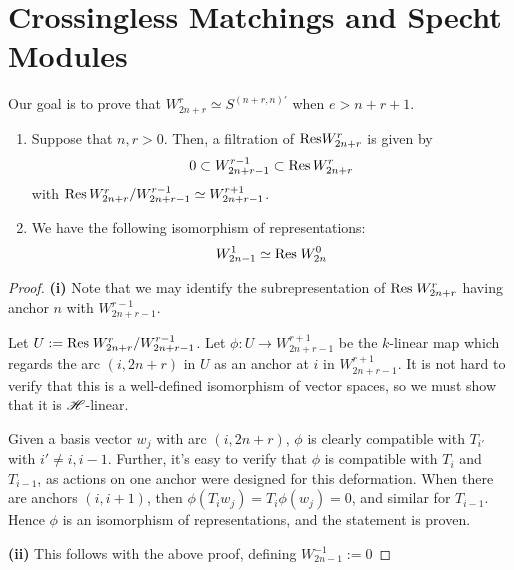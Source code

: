 \documentclass{amsart}
\begin{document}
\newpage
\section{Crossingless Matchings and Specht Modules}
Our goal is to prove that $W_{2n + r}^r \simeq S^{(n+r,n)'}$ when $e > n + r + 1$.
\begin{proposition}
  \begin{enumerate}[label={(\roman*)}]
    \item
    Suppose that $n,r > 0$.
    Then, a filtration of $\text{Res} W_{2n + r}^r$ is given by
    \begin{equation}
      0 \subset W_{2n + r - 1}^{r-1} \subset \text{Res} \, W_{2n + r}^r \label{Filtration}
    \end{equation}
    with $\text{Res} \, W_{2n + r}^r / W_{2n + r - 1}^{r-1} \simeq W_{2n + r - 1}^{r + 1}$. 
    \item
      We have the following isomorphism of representations:
      \begin{equation}
        W_{2n - 1}^1 \simeq \text{Res} \; W_{2n}^0 \label{0 Restriction}
      \end{equation}
  \end{enumerate}
\end{proposition}
\begin{proof}
  \textbf{(i)}
  Note that we may identify the subrepresentation of $\text{Res} \; W_{2n + r}^r$ having anchor $n$ with $W_{2n + r - 1}^{r-1}$.
  
  Let $U := \text{Res} \; W_{2n + r}^r / W_{2n + r - 1}^{r - 1}$. 
  Let $\phi:U \rightarrow W_{2n + r - 1}^{r + 1}$ be the $k$-linear map which regards the arc $(i,2n + r)$ in $U$ as an anchor at $i$ in $W_{2n + r - 1}^{r + 1}$.
  It is not hard to verify that this is a well-defined isomorphism of vector spaces, so we must show that it is $\mathscr{H}$-linear.

  Given a basis vector $w_j$ with arc $(i,2n + r)$, $\phi$ is clearly compatible with $T_{i'}$ with $i' \neq i,i-1$.
  Further, it's easy to verify that $\phi$ is compatible with $T_{i}$ and $T_{i-1}$, as actions on one anchor were designed for this deformation.
  When there are anchors $(i,i+1)$, then $\phi(T_iw_j) = T_i\phi(w_j) = 0$, and similar for $T_{i -1}$.
  Hence $\phi$ is an isomorphism of representations, and the statement is proven.

  \textbf{(ii)}
  This follows with the above proof, defining $W_{2n - 1}^{-1} := 0$
\end{proof}
\end{document}
